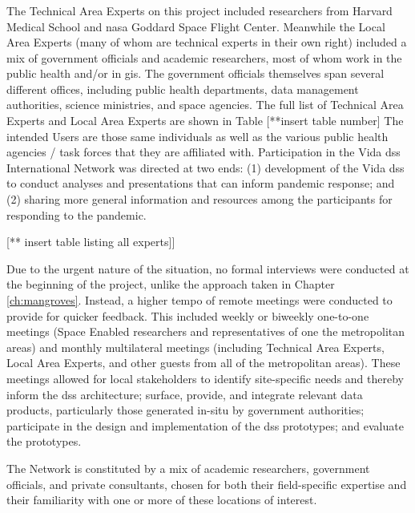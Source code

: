 \subsubsection{}

The Technical Area Experts on this project included researchers from Harvard Medical School and \ac{nasa} Goddard Space Flight Center. Meanwhile the Local Area Experts (many of whom are technical experts in their own right) included a mix of government officials and academic researchers, most of whom work in the public health and/or in \ac{gis}. The government officials themselves span several different offices, including public health departments, data management authorities, science ministries, and space agencies. The full list of Technical Area Experts and Local Area Experts are shown in Table [**insert table number] The intended Users are those same individuals as well as the various public health agencies / task forces that they are affiliated with.  Participation in the Vida \ac{dss} International Network was directed at two ends: (1) development of the Vida \ac{dss} to conduct analyses and presentations that can inform pandemic response; and (2) sharing more general information and resources among the participants for responding to the pandemic.

[** insert table listing all experts]]

Due to the urgent nature of the situation, no formal interviews were conducted at the beginning of the project, unlike the approach taken in Chapter \ref{ch:mangroves}. Instead, a higher tempo of remote meetings were conducted to provide for quicker feedback. This included weekly or biweekly one-to-one meetings (Space Enabled researchers and representatives of one the metropolitan areas) and monthly multilateral meetings (including Technical Area Experts, Local Area Experts, and other guests from all of the metropolitan areas). These meetings allowed for local stakeholders to identify site-specific needs and thereby inform the \ac{dss} architecture; surface, provide, and integrate relevant data products, particularly those generated in-situ by government authorities; participate in the design and implementation of the \ac{dss} prototypes; and evaluate the prototypes.

The Network is constituted by a mix of academic researchers, government officials, and private consultants, chosen for both their field-specific expertise and their familiarity with one or more of these locations of interest.

